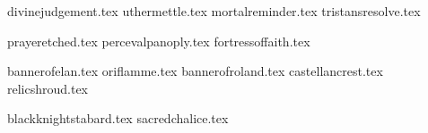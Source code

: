 
\raggedcolumns
\begin{multicols}{2}

	\subtitle{\weaponenchantments}
	
	\startsortedpricelist
	
	{divinejudgement.tex}
	{uthermettle.tex}
	{mortalreminder.tex}
	{tristansresolve.tex}
	
	\endsortedpricelist

	\subtitle{\armourenchantments}
	
	\startsortedpricelist
	
	{prayeretched.tex}
	{percevalpanoply.tex}
	{fortressoffaith.tex}

	\endsortedpricelist

	\subtitle{\bannerenchantments}

	\startsortedpricelistNSP
	
	{bannerofelan.tex}
	{oriflamme.tex}
	{bannerofroland.tex}
	{castellancrest.tex}
	{relicshroud.tex}

	\endsortedpricelistNSP

	\subtitle{\artefacts}
	
	\startsortedpricelist

	{blackknightstabard.tex}
	{sacredchalice.tex}

	\endsortedpricelist

\end{multicols}


